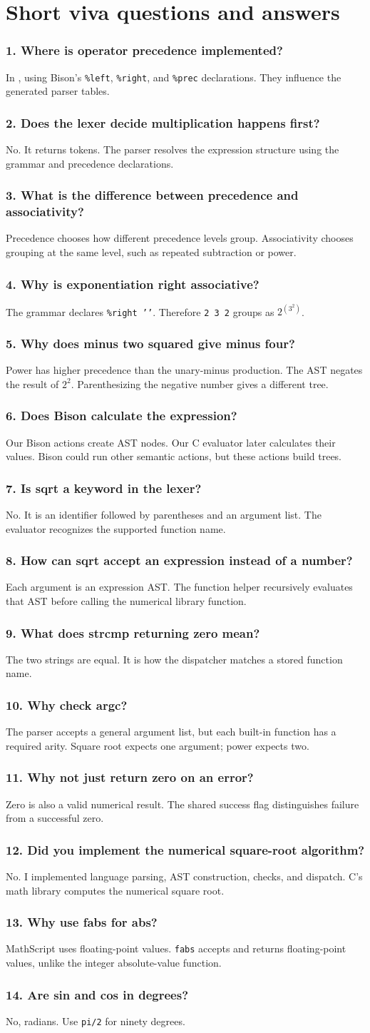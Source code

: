 \documentclass[11pt,a4paper]{report}
\newcommand{\file}[1]{\texttt{\detokenize{#1}}}
\newcommand{\qa}[2]{\subsection*{#1}#2}
\begin{document}
\chapter{Short viva questions and answers}
\qa{1. Where is operator precedence implemented?}
In \file{src/parser.y}, using Bison's \texttt{\%left}, \texttt{\%right},
and \texttt{\%prec} declarations. They influence the generated parser tables.
\qa{2. Does the lexer decide multiplication happens first?}
No. It returns tokens. The parser resolves the expression structure using
the grammar and precedence declarations.
\qa{3. What is the difference between precedence and associativity?}
Precedence chooses how different precedence levels group. Associativity
chooses grouping at the same level, such as repeated subtraction or power.
\qa{4. Why is exponentiation right associative?}
The grammar declares \texttt{\%right ''}. Therefore
\texttt{2 3 2} groups as $2^{(3^2)}$.
\qa{5. Why does minus two squared give minus four?}
Power has higher precedence than the unary-minus production. The AST negates
the result of $2^2$. Parenthesizing the negative number gives a different tree.
\qa{6. Does Bison calculate the expression?}
Our Bison actions create AST nodes. Our C evaluator later calculates their
values. Bison could run other semantic actions, but these actions build trees.
\qa{7. Is sqrt a keyword in the lexer?}
No. It is an identifier followed by parentheses and an argument list.
The evaluator recognizes the supported function name.
\qa{8. How can sqrt accept an expression instead of a number?}
Each argument is an expression AST. The function helper recursively evaluates
that AST before calling the numerical library function.
\qa{9. What does strcmp returning zero mean?}
The two strings are equal. It is how the dispatcher matches a stored function name.
\qa{10. Why check argc?}
The parser accepts a general argument list, but each built-in function has a
required arity. Square root expects one argument; power expects two.
\qa{11. Why not just return zero on an error?}
Zero is also a valid numerical result. The shared success flag distinguishes
failure from a successful zero.
\qa{12. Did you implement the numerical square-root algorithm?}
No. I implemented language parsing, AST construction, checks, and dispatch.
C's math library computes the numerical square root.
\qa{13. Why use fabs for abs?}
MathScript uses floating-point values. \texttt{fabs} accepts and returns
floating-point values, unlike the integer absolute-value function.
\qa{14. Are sin and cos in degrees?}
No, radians. Use \texttt{pi/2} for ninety degrees.
\end{document}
